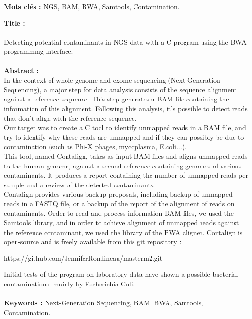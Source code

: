 \documentclass[a4paper,12pt]{article}
\begin{document}
\textbf{Mots clés :} NGS, BAM, BWA, Samtools, Contamination. \\
\clearpage

\textbf{Title :} \\\\
Detecting potential contaminants in NGS data with a C program using the BWA programming interface. \\
\\
\textbf{Abstract :} \\

In the context of whole genome and exome sequencing (Next Generation Sequencing), a major step for data analysis consists of the sequence alignment against a reference sequence. This step generates a BAM file containing the information of this alignment. Following this analysis, it's possible to detect reads that don't align with the reference sequence. \\
Our target was to create a C tool to identify unmapped reads in a BAM file, and try to identify why these reads are unmapped and if they can possibly be due to contamination (such as Phi-X phages, mycoplasma, E.coli...).\\
This tool, named Contalign, takes as input BAM files and aligns unmapped reads to the human genome, against a second reference containing genomes of various contaminants. It produces a report containing the number of unmapped reads per sample and a review of the detected contaminants. \\
Contalign provides various backup proposals, including backup of unmapped reads in a FASTQ file, or a backup of the report of the alignment of reads on contaminants. Order to read and process information BAM files, we used the Samtools library, and in order to achieve alignment of unmapped reads against the reference contaminant, we used the library of the BWA aligner. Contalign is open-source and is freely available from this git repository : \begin{center} https://github.com/JenniferRondineau/masterm2.git \end{center}
Initial tests of the program on laboratory data have shown a possible bacterial contaminations, mainly by Escherichia Coli.\\\\

\textbf{Keywords :} Next-Generation Sequencing, BAM, BWA, Samtools, Contamination.
\clearpage %
\renewcommand{\contentsname}{Sommaire} 
\tableofcontents{} %
\clearpage
\end{document}

